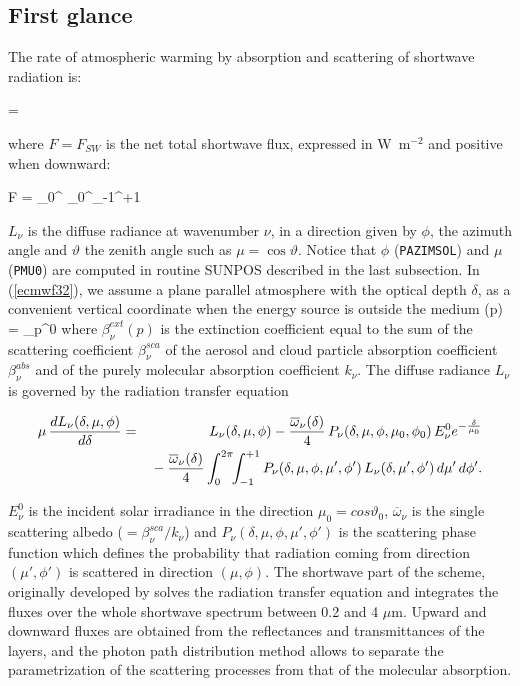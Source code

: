 %
\subsection{First glance}
%

The rate of atmospheric warming by absorption and scattering of shortwave radiation is:

%

\medskip
\be
{} =  
\label{ecmwf31}
\ee
\medskip

\noindent where $F=F_{SW}$ is the net total shortwave flux, expressed in
W~m$^{-2}$ and positive when downward:

\medskip
\be
F = \int_0^\infty{} \int_0^\pi{}\int_{-1}^{+1}
\label{ecmwf32}
\ee
\medskip

$L_{\nu}$ is the diffuse radiance at wavenumber $\nu$, in a direction given by $\phi$, the azimuth angle and $\vartheta $ the zenith angle such as $\mu =\cos\vartheta $. Notice that $\phi$ ({\tt PAZIMSOL}) and $\mu$ ({\tt PMU0}) are
computed in routine SUNPOS described in the last subsection. In (\ref{ecmwf32}),
we assume a plane parallel atmosphere with the optical depth $\delta$, as
a convenient vertical coordinate when the energy source is outside the medium
\medskip
\be
\delta(p) = \int_p^0
\label{ecmwf33}
\ee
\medskip
\noindent where $\beta_{\nu}^{ext}(p)$ is the extinction coefficient equal to
the sum of the scattering coefficient $\beta_{\nu}^{sca}$ of the aerosol and
cloud particle absorption coefficient $\beta_{\nu}^{abs}$ and of the purely molecular absorption coefficient $k_{\nu}$. The diffuse radiance $L_{\nu}$ is governed by the radiation transfer equation

\medskip
\begin{eqnarray}\label{ecmwf34}
\mu \, \frac{dL_{\nu}(\delta,\mu,\phi)}{d\delta} &=&
L_{\nu}(\delta,\mu,\phi) - \frac{\overline{\omega}_{\nu}(\delta)}{4} \, P_{\nu}(\delta,\mu,\phi,\mu_0,\phi_0) \, E_{\nu}^0 e^{-\frac{\delta}{\mu_0}} \cr
                                                 & &
\mbox{}- \frac{\overline{\omega}_{\nu}(\delta)}{4} \int_0^{2\pi}\!\!\int_{-1}^{+1}{P_{\nu}(\delta,\mu,\phi,\mu',\phi') \, L_{\nu}(\delta,\mu',\phi') \, d\mu' \, d\phi'}.
\end{eqnarray}
\medskip

$E_{\nu}^0$ is the incident solar irradiance in the direction $\mu_0 = cos\vartheta _0$, $\overline{\omega}_{\nu}$ is the single scattering albedo ($= \beta_{\nu}^{sca} / k_\nu$) and $P_{\nu}(\delta,\mu,\phi,\mu',\phi')$ is the scattering phase function which defines the probability that radiation coming from direction $(\mu',\phi')$ is scattered in direction $(\mu,\phi)$.
The shortwave part of the scheme, originally developed by \citet{Fouquart1980} solves the radiation transfer equation and integrates the fluxes over the whole shortwave spectrum between 0.2 and 4 $\mu$m. Upward and downward fluxes are obtained from the reflectances and transmittances of the layers, and the photon path distribution method allows to separate the parametrization of the scattering processes from that of the molecular absorption.

